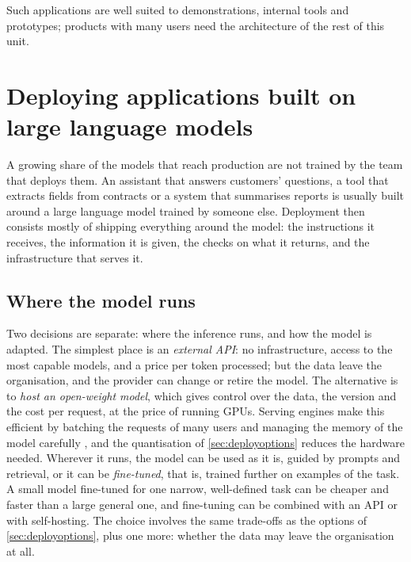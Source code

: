 Such applications are well suited to demonstrations, internal tools and prototypes; products with many users need
the architecture of the rest of this unit.

\section{Deploying applications built on large language models}\label{sec:llmapps}

A growing share of the models that reach production are not trained by the team that deploys them. An assistant
that answers customers' questions, a tool that extracts fields from contracts or a system that summarises reports
is usually built around a large language model trained by someone else. Deployment then consists mostly of shipping everything around the model: the instructions it receives, the information it is given, the checks on
what it returns, and the infrastructure that serves it.

\subsection{Where the model runs}

Two decisions are separate: where the inference runs, and how the model is adapted. The simplest place is an
\emph{external API}: no infrastructure, access to the most capable models, and a price per token processed; but the data leave the organisation, and the provider can change or retire
the model. The alternative is to \emph{host an open-weight model}, which gives control over the data, the version and the
cost per request, at the price of running GPUs. Serving engines make this efficient by batching the requests of many users and managing the memory
of the model carefully \citep{kwon2023efficient}, and the quantisation of
\cref{sec:deployoptions} reduces the hardware needed. Wherever it runs, the model can be
used as it is, guided by prompts and retrieval, or it can be \emph{fine-tuned}, that is, trained further on examples of the task. A small model fine-tuned for one narrow, well-defined task can be
cheaper and faster than a large general one, and fine-tuning can be combined with an API
or with self-hosting. The choice involves the same
trade-offs as the options of \cref{sec:deployoptions}, plus one more: whether the data may leave the organisation at all.

